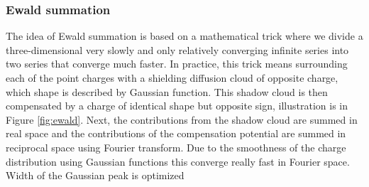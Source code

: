 \subsubsection{Ewald summation}

The idea of Ewald summation is based on a mathematical trick where we divide a three-dimensional very slowly and only relatively converging infinite series into two series that converge much faster. In practice, this trick means surrounding each of the point charges with a shielding diffusion cloud of opposite charge, which shape is described by Gaussian function. This shadow cloud is then compensated by a charge of identical shape but opposite sign, illustration is in Figure \ref{fig:ewald}. Next, the contributions from the shadow cloud are summed in real space and the contributions of the compensation potential are summed in reciprocal space using Fourier transform. Due to the smoothness of the charge distribution using Gaussian functions this converge really fast in Fourier space. Width of the Gaussian peak is optimized   


%
%
%
%
%

